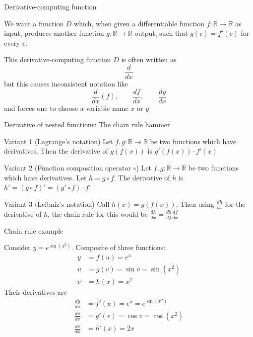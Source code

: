 \documentclass[12pt,aspectratio=169,handout]{beamer}
\begin{document}
\begin{frame}{Derivative-computing function}
	
	We want a function $D$ which, when given a differentiable function $f : \mathbb{R} \to \mathbb{R}$ as input, produces another function $g : \mathbb{R} \to \mathbb{R}$ output, such that $g(c) = f'(c)$ for every $c$.
	
	\bigskip
	\pause
	This derivative-computing function $D$ is often written as 
	$$\frac{d}{dx}$$
	but this causes inconsistent notation like
	$$\frac{d}{dx}(f), \qquad \frac{df}{dx}, \qquad \frac{dy}{dx}$$
	and forces one to choose a variable name $x$ or $y$
	
\end{frame}

\begin{frame}{Derivative of nested functions: The chain rule hammer}
	
	
	\begin{block}{Variant 1 (Lagrange's notation)}
		Let $f, g : \mathbb{R} \to \mathbb{R}$ be two functions which have derivatives. Then the derivative of $g (f(x))$ is $g' (f(x)) \cdot f' (x)$
	\end{block}
	\pause
	
	\begin{block}{Variant 2 (Function composition operator $\circ$)}
		Let $f, g : \mathbb{R} \to \mathbb{R}$ be two functions which have derivatives. Let $h = g \circ f$. The derivative of $h$ is $h'=(g \circ f)'=(g'\circ f)\cdot f'$
	\end{block}
	\pause
	
\begin{block}{Variant 3 (Leibniz's notation)}
		Call $h(x) = g(f(x))$. Then using $\frac{dh}{dx}$ for the derivative of $h$, the chain rule for this would be $\frac{dh}{dx} = \frac{dh}{df} \frac{df}{dx}$
	\end{block}
	
\end{frame}


\begin{frame}{Chain rule example}
	
	Consider $y=e^{\sin(x^{2})}$. Composite of three functions:
	$$
	\begin{aligned}
		y &= f(u) = e^u \\
		u &= g(v) = \sin v = \sin (x^2) \\
		v &= h(x) = x^2
	\end{aligned}
	$$
	\pause
	Their derivatives are
	$$
	\begin{aligned}
		\frac{dy}{du} &= f'(u) = e^u = e^{\sin(x^{2})} \\
		\frac{du}{dv} &= g'(v) = \cos v = \cos (x^2) \\
		\frac{dv}{dx} &= h'(x) = 2x
	\end{aligned}
	$$
\end{frame}
\end{document}
